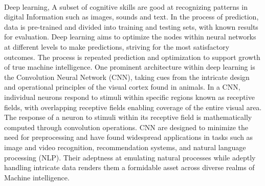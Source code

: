 \\
Deep learning\cite{lecun2015deep}, A subset of cognitive skills are good at recognizing patterns in digital Information such as images, sounds and text. In the process of prediction, data is pre-trained and divided into training and testing sets, with known results for evaluation. Deep learning aims to optimize the nodes within neural networks at different levels to make predictions, striving for the most satisfactory outcomes. The process is repeated prediction and optimization to support growth of true machine intelligence. One prominent architecture within deep learning is the Convolution Neural Network (CNN), taking cues from the intricate design and operational principles of the visual cortex found in animals. In a CNN, individual neurons respond to stimuli within specific regions known as receptive fields, with overlapping receptive fields enabling coverage of the entire visual area. The response of a neuron to stimuli within its receptive field is mathematically computed through convolution operations. CNN are designed to minimize the need for preprocessing and have found widespread applications in tasks such as image and video recognition, recommendation systems, and natural language processing (NLP). Their adeptness at emulating natural processes while adeptly handling intricate data renders them a formidable asset across diverse realms of Machine intelligence\cite{babu2022sentiment}.

